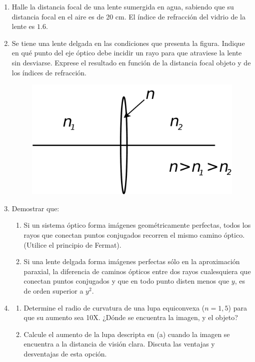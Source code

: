 \documentclass[11pt,spanish,a4paper]{article}
\begin{document}
\begin{enumerate}
\item Halle la distancia focal de una lente sumergida en agua, sabiendo
que su distancia focal en el aire es de 20 cm. El índice de refracción
del vidrio de la lente es $1.6$. 


\item Se tiene una lente delgada en las condiciones que presenta la figura.
Indique en qué punto del eje óptico debe incidir un rayo para que
atraviese la lente sin desviarse. Exprese el resultado en función
de la distancia focal objeto y de los índices de refracción.
\begin{figure}[H]
\centering{}\includegraphics[clip,scale=0.25]{ej3-25}
\end{figure}



\item Demostrar que:
\begin{enumerate}
\item Si un sistema óptico forma imágenes geométricamente perfectas, todos
los rayos que conectan puntos conjugados recorren el mismo camino
óptico. (Utilice el principio de Fermat).
\item Si una lente delgada forma imágenes perfectas sólo en la aproximación
paraxial, la diferencia de caminos ópticos entre dos rayos cualesquiera
que conectan puntos conjugados y que en todo punto disten menos que
$y$, es de orden superior a $y^{2}$.
\end{enumerate}


\item
\begin{enumerate}
\item Determine el radio de curvatura de una lupa equiconvexa ($n=1,5$)
para que su aumento sea 10X. ¿Dónde se encuentra la imagen, y el objeto?
\item Calcule el aumento de la lupa descripta en (a) cuando la imagen se
encuentra a la distancia de visión clara. Discuta las ventajas y desventajas
de esta opción.
\end{enumerate}



\end{enumerate}
\end{document}
